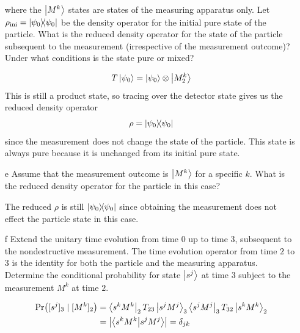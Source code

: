 \documentclass[a4paper,twoside]{article}
\begin{document}
\begin{itemize}
\begin{equation}
        \end{equation}
        where the $ \ket{M^k} $ states are states of the measuring apparatus only. Let $ \rho_{\text{ini}} = \op{\psi_0} $ be the density operator for the initial pure state of the particle. What is the reduced density operator for the state of the particle subsequent to the measurement (irrespective of the measurement outcome)? Under what conditions is the state pure or mixed?
        \begin{tcolorbox}[breakable]
            \begin{equation}
                T \ket{\psi_0} = \ket{\psi_0} \otimes \ket{M_2^k}
            \end{equation}
            This is still a product state, so tracing over the detector state gives us the reduced density operator
            \begin{equation}
                \rho = \op{\psi_0}
            \end{equation}
            since the measurement does not change the state of the particle. This state is always pure because it is unchanged from its initial pure state.
        \end{tcolorbox}
    \item[e] Assume that the measurement outcome is $ \ket{M^k} $ for a specific $ k $. What is the reduced density operator for the particle in this case?
        \begin{tcolorbox}[breakable]
            The reduced  $ \rho $ is still $ \op{\psi_0} $ since obtaining the measurement does not effect the particle state in this case.
        \end{tcolorbox}
    \item[f] Extend the unitary time evolution from time $ 0 $ up to time $ 3 $, subsequent to the nondestructive measurement. The time evolution operator from time $ 2 $ to $ 3 $ is the identity for both the particle and the measuring apparatus. Determine the conditional probability for state $ \ket{s^j} $ at time $ 3 $ subject to the measurement $ M^k $ at time $ 2 $.
        \begin{tcolorbox}[breakable]
            \begin{align}
                \Pr([s^j]_3\mid[M^k]_2) &= \bra{s^k M^k}_2 T_{23} \ket{s^j M^j}_3 \bra{s^j M^j}_3 T_{32} \ket{s^k M^k}_2\\
                &= \abs{\ip{s^k M^k}{s^j M^j}} = \delta_{jk}
            \end{align}
        \end{tcolorbox}
\end{itemize}
\end{document}
